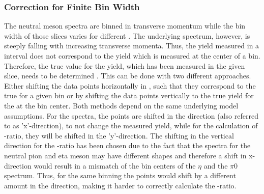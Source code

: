 \subsubsection{Correction for Finite Bin Width}
\label{sec:BinShift}
The neutral meson spectra are binned in transverse momentum while the bin width of those slices varies for different \pT. The underlying spectrum, however, is steeply falling with increasing transverse momenta.
Thus, the yield measured in a \pT interval does not correspond to the yield which is measured at the center of a \pT bin.
Therefore, the true \pT value for the yield, which has been measured in the given slice, needs to be determined \cite{Lafferty1994cj}.
This can be done with two different approaches. Either shifting the data points horizontally in \pT, such that they correspond to the true \pT for a given bin or by shifting the data points vertically to the true yield for the \pT at the bin center.
Both methods depend on the same underlying model assumptions.
For the spectra, the points are shifted in the \pT direction (also referred to as 'x'-direction), to not change the measured yield, while for the calculation of \EtaToPi-ratio, they will be shifted in the 'y'-direction.
The shifting in the vertical direction for the \EtaToPi-ratio has been chosen due to the fact that the spectra for the neutral pion and eta meson may have different shapes and therefore a shift in x-direction would result in a mismatch of the bin centers of the $\eta$ and the $\pi0$ spectrum.
Thus, for the same binning the points would shift by a different amount in the \pT direction, making it harder to correctly calculate the \EtaToPi-ratio.


